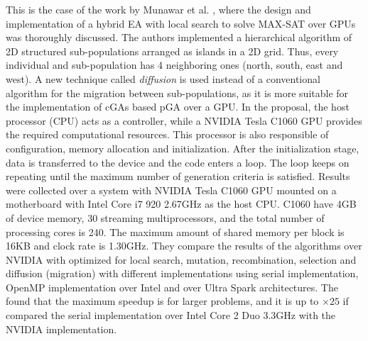 \documentclass{article}
\begin{document}
This is the case of the work by Munawar et al. \cite{Munawar:2009:HGA:1666141_1666143}, where the design and implementation of a hybrid EA with local search to solve MAX-SAT over GPUs was thoroughly discussed. The authors implemented a hierarchical algorithm of 2D structured sub-populations arranged as islands in a 2D grid. Thus, every individual and sub-population has 4 neighboring ones (north, south, east and west). A new technique called {\em diffusion} is used instead of a conventional algorithm for the migration between sub-populations, as it is more suitable for the implementation of cGAs based pGA over a GPU. In the proposal, the host processor (CPU) acts as a controller, while a NVIDIA Tesla C1060 GPU provides the required computational resources. This processor is also responsible of configuration, memory allocation and initialization. After the initialization stage, data is transferred to the device and the code enters a loop. The loop keeps on repeating until the maximum number of generation criteria is satisfied. Results were collected over a system with NVIDIA Tesla C1060 GPU mounted on a motherboard with Intel Core i7 920 2.67GHz as the host CPU. C1060 have 4GB of device memory, 30 streaming multiprocessors, and the total number of processing cores is 240. The maximum amount of shared memory per block is 16KB and clock rate is 1.30GHz. They compare the results of the algorithms over NVIDIA with optimized for local search, mutation, recombination, selection and diffusion (migration) with different implementations using serial implementation, OpenMP implementation over Intel and over Ultra Spark architectures. The found that the maximum speedup is for larger problems, and it is up to $\times25$ if compared the serial implementation over Intel Core 2 Duo 3.3GHz with the NVIDIA implementation. 

\end{document}
